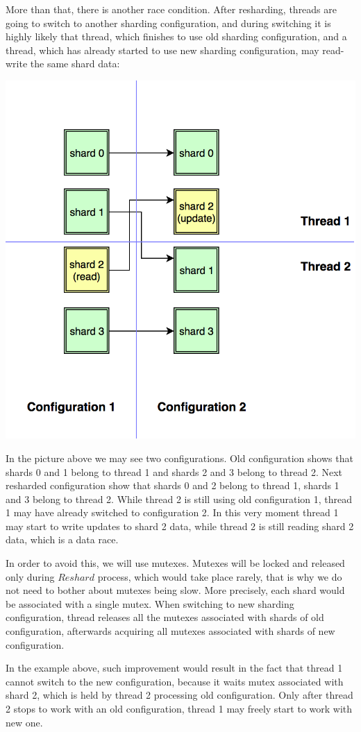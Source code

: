 \documentclass{article}
\begin{document}
More than that, there is another race condition. After resharding, threads are going to switch to another sharding configuration, and during switching it is highly likely that thread, which finishes to use old sharding configuration, and a thread, which has already started to use new sharding configuration, may read-write the same shard data:

\begin{center}\includegraphics[width=0.5 \textwidth]{image6.png}\end{center}

In the picture above we may see two configurations. Old configuration shows that shards 0 and 1 belong to thread 1 and shards 2 and 3 belong to thread 2. Next resharded configuration show that shards 0 and 2 belong to thread 1, shards 1 and 3 belong to thread 2. While thread 2 is still using old configuration 1, thread 1 may have already switched to configuration 2. In this very moment thread 1 may start to write updates to shard 2 data, while thread 2 is still reading shard 2 data, which is a data race.

In order to avoid this, we will use mutexes. Mutexes will be locked and released only during $Reshard$ process, which would take place rarely, that is why we do not need to bother about mutexes being slow. More precisely, each shard would be associated with a single mutex. When switching to new sharding configuration, thread releases all the mutexes associated with shards of old configuration, afterwards acquiring all mutexes associated with shards of new configuration.

In the example above, such improvement would result in the fact that thread 1 cannot switch to the new configuration, because it waits mutex associated with shard 2, which is held by thread 2 processing old configuration. Only after thread 2 stops to work with an old configuration, thread 1 may freely start to work with new one.
\end{document}
